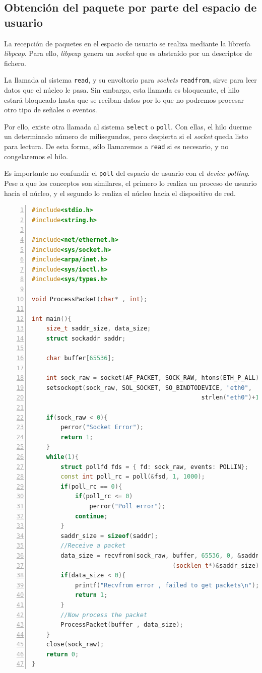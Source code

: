 \subsection{Obtención del paquete por parte del espacio de usuario}
La recepción de paquetes en el espacio de usuario se realiza mediante la librería \emph{\gls{libpcap}}.
Para ello, \emph{\gls{libpcap}} genera un \emph{\gls{socket}} que es abstraído por un descriptor de fichero. 

La llamada al sistema \texttt{read}, y su envoltorio para \emph{sockets} \texttt{readfrom}, sirve para leer datos 
que el núcleo le pasa. Sin embargo, esta llamada es bloqueante, el hilo estará bloqueado hasta que se reciban datos por 
lo que no podremos procesar otro tipo de señales o eventos.

Por ello, existe otra llamada al sistema \texttt{select} o \texttt{poll}. Con ellas, el hilo duerme un determinado 
número de milisegundos, pero despierta si el \emph{\gls{socket}} queda listo para lectura. De esta forma, sólo 
llamaremos a \texttt{read} si es necesario, y no congelaremos el hilo.

Es importante no confundir el \texttt{poll} del espacio de usuario con el \emph{device polling}. Pese a que los 
conceptos son similares, el primero lo realiza un proceso de usuario hacia el núcleo, y el segundo lo realiza el núcleo 
hacia el dispositivo de red.

\begin{lstlisting}[language=C++,caption={Lectura desde un socket crudo}, 
breaklines=true, label=code:lecturaRawSocket,numbers=left,float=phtb]
#include<stdio.h>
#include<string.h>

#include<net/ethernet.h>
#include<sys/socket.h>
#include<arpa/inet.h>
#include<sys/ioctl.h>
#include<sys/types.h>
 
void ProcessPacket(char* , int);
 
int main(){
    size_t saddr_size, data_size;
    struct sockaddr saddr;
         
    char buffer[65536];
   
    int sock_raw = socket(AF_PACKET, SOCK_RAW, htons(ETH_P_ALL));
    setsockopt(sock_raw, SOL_SOCKET, SO_BINDTODEVICE, "eth0", 
                                               strlen("eth0")+1);
     
    if(sock_raw < 0){
        perror("Socket Error");
        return 1;
    }
    while(1){
        struct pollfd fds = { fd: sock_raw, events: POLLIN};
        const int poll_rc = poll(&fsd, 1, 1000);
        if(poll_rc == 0){
            if(poll_rc <= 0)
                perror("Poll error");
            continue;
        }
        saddr_size = sizeof(saddr);
        //Receive a packet
        data_size = recvfrom(sock_raw, buffer, 65536, 0, &saddr, 
                                       (socklen_t*)&saddr_size);
        if(data_size < 0){
            printf("Recvfrom error , failed to get packets\n");
            return 1;
        }
        //Now process the packet
        ProcessPacket(buffer , data_size);
    }
    close(sock_raw);
    return 0;
}
\end{lstlisting}

